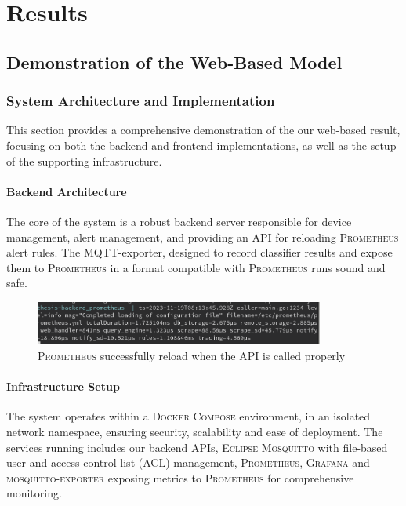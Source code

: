 \chapter{Results}

\section{Demonstration of the Web-Based Model}


\subsection{System Architecture and Implementation}
This section provides a comprehensive demonstration of the our web-based result, focusing on both the backend and frontend implementations, as well as the setup of the supporting infrastructure.

\subsubsection{Backend Architecture}
The core of the system is a robust backend server responsible for device management, alert management, and providing an API for reloading \textsc{Prometheus} alert rules. The MQTT-exporter, designed to record classifier results and expose them to \textsc{Prometheus} in a format compatible with \textsc{Prometheus} runs sound and safe.

\begin{figure}[htbp]
  \centering
  \includegraphics[width=0.85\textwidth]{Pictures/prometheusreload}
  \caption{\label{fig:prometheusreload}\textsc{Prometheus} successfully reload when the API is called properly}
\end{figure}

\subsubsection{Infrastructure Setup}
The system operates within a \textsc{Docker Compose} environment, in an isolated network namespace, ensuring security, scalability and ease of deployment. The services running includes our backend APIs, \textsc{Eclipse Mosquitto} with file-based user and access control list (ACL) management, \textsc{Prometheus}, \textsc{Grafana} and \textsc{mosquitto-exporter} exposing metrics to \textsc{Prometheus} for comprehensive monitoring.

